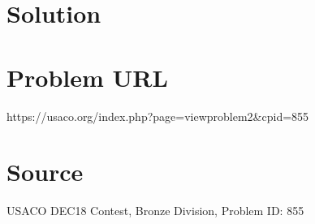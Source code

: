 \documentclass[12pt]{article}
\begin{document}
\section*{Solution}


\section*{Problem URL}
https://usaco.org/index.php?page=viewproblem2&cpid=855

\section*{Source}
USACO DEC18 Contest, Bronze Division, Problem ID: 855
\end{document}
